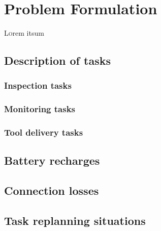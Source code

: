 \chapter{Problem Formulation}
\label{ch:ProblemDFormulation}
\lettrine[lraise=-0.1, lines=2, loversize=0.2]{L}{o}rem itsum


\section{Description of tasks}
\label{sec:DescriptionOfTasks}

\subsection{Inspection tasks}
\label{subsec:InspectionTasks}

\subsection{Monitoring tasks}
\label{subsec:MonitoringTasks}

\subsection{Tool delivery tasks}
\label{subsec:ToolDeliveryTasks}


\section{Battery recharges}
\label{sec:BatteryRecharges}

\section{Connection losses}
\label{sec:ConnectionLosses}

\section{Task replanning situations}
\label{sec:TaskReplanningSituations}

